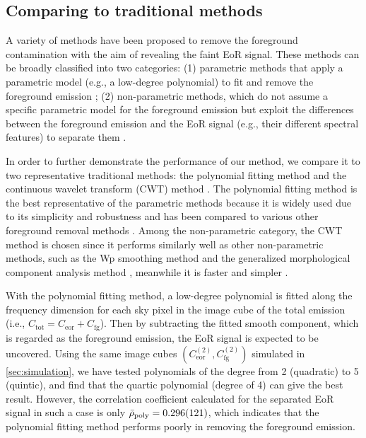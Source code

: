 \documentclass[fleqn,usenatbib]{mnras}
\newcommand{\R}[1]{\mathrm{#1}}
\begin{document}
\subsection{Comparing to traditional methods}
\label{sec:comparisons}

A variety of methods have been proposed to remove the foreground
contamination with the aim of revealing the faint EoR signal.
These methods can be broadly classified into two categories:
(1) parametric methods that apply a parametric model (e.g., a low-degree
polynomial) to fit and remove the foreground emission
\citep[e.g.,][]{wang2006,jelic2008,liu2009fgrm,wang2013,bonaldi2015};
(2) non-parametric methods, which do not assume a specific parametric model
for the foreground emission but exploit the differences between the
foreground emission and the EoR signal (e.g., their different spectral
features) to separate them
\citep[e.g.,][]{harker2009,chapman2012,chapman2013,gu2013,mertens2018}.

In order to further demonstrate the performance of our method, we compare
it to two representative traditional methods:
the polynomial fitting method \citep[e.g.,][]{wang2006} and
the continuous wavelet transform (CWT) method \citep{gu2013}.
The polynomial fitting method is the best representative of the parametric
methods because it is widely used due to its simplicity and robustness
\citep[e.g.,][]{jelic2008,liu2009ps,pritchard2010}
and has been compared to various other foreground removal methods
\citep[e.g.,][]{harker2009,alonso2015,chapman2015}.
Among the non-parametric category, the CWT method is chosen since it
performs similarly well as other non-parametric methods, such as the
Wp smoothing method \citep{harker2009} and the generalized morphological
component analysis method \citep{chapman2013},
meanwhile it is faster and simpler \citep{gu2013,chapman2015}.

With the polynomial fitting method,
a low-degree polynomial is fitted along the frequency dimension for each
sky pixel in the image cube of the total emission (i.e.,
$C_{\R{tot}} = C_{\R{eor}} + C_{\R{fg}}$).
Then by subtracting the fitted smooth component, which is regarded as
the foreground emission, the EoR signal is expected to be uncovered.
Using the same image cubes
$\left( C_{\R{eor}}^{(2)}, C_{\R{fg}}^{(2)} \right)$
simulated in \autoref{sec:simulation},
we have tested polynomials of the degree from 2 (quadratic) to
5 (quintic), and find that the quartic polynomial (degree of 4)
can give the best result.
However, the correlation coefficient calculated for the separated EoR
signal in such a case is only
$\bar{\rho}_{\R{poly}} = \num{0.296 +- 0.121}$,
which indicates that the polynomial fitting method performs poorly in
removing the foreground emission.
\end{document}
